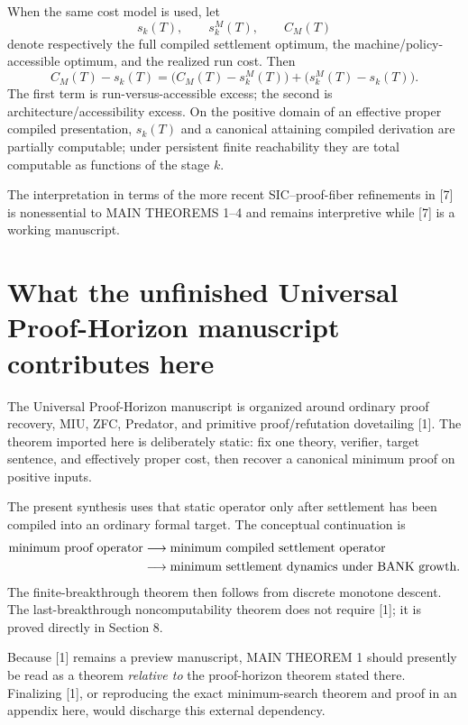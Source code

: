 \documentclass[11pt]{article}
\theoremstyle{definition}
\newcommand{\BANK}{\ensuremath{\mathrm{BANK}}}
\begin{document}
When the same cost model is used, let
\[
s_k(T),\qquad s_k^M(T),\qquad C_M(T)
\]
denote respectively the full compiled settlement optimum, the machine/policy-accessible optimum, and the realized run cost. Then
\[
C_M(T)-s_k(T)
=
\bigl(C_M(T)-s_k^M(T)\bigr)
+
\bigl(s_k^M(T)-s_k(T)\bigr).
\]
The first term is run-versus-accessible excess; the second is architecture/accessibility excess. On the positive domain of an effective proper compiled presentation, $s_k(T)$ and a canonical attaining compiled derivation are partially computable; under persistent finite reachability they are total computable as functions of the stage $k$.

The interpretation in terms of the more recent SIC--proof-fiber refinements in [7] is nonessential to MAIN THEOREMS 1--4 and remains interpretive while [7] is a working manuscript.

\section{What the unfinished Universal Proof-Horizon manuscript contributes here}
The Universal Proof-Horizon manuscript is organized around ordinary proof recovery, MIU, ZFC, Predator, and primitive proof/refutation dovetailing [1]. The theorem imported here is deliberately static: fix one theory, verifier, target sentence, and effectively proper cost, then recover a canonical minimum proof on positive inputs.

The present synthesis uses that static operator only after settlement has been compiled into an ordinary formal target. The conceptual continuation is
\[
\begin{aligned}
\text{minimum proof operator}
&\longrightarrow \text{minimum compiled settlement operator}\\
&\longrightarrow \text{minimum settlement dynamics under \BANK\ growth}.
\end{aligned}
\]
The finite-breakthrough theorem then follows from discrete monotone descent. The last-breakthrough noncomputability theorem does not require [1]; it is proved directly in Section 8.

Because [1] remains a preview manuscript, MAIN THEOREM 1 should presently be read as a theorem \emph{relative to} the proof-horizon theorem stated there. Finalizing [1], or reproducing the exact minimum-search theorem and proof in an appendix here, would discharge this external dependency.
\end{document}
